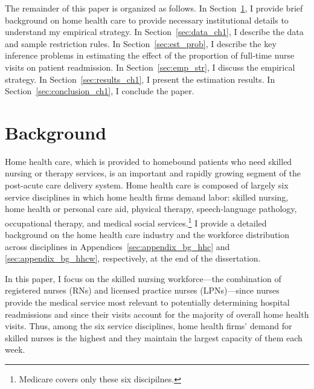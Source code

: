 \documentclass[final,12pt]{article}
\begin{document}
The remainder of this paper is organized as follows.
In Section~\ref{sec:background_ch1}, I provide brief background on home health care to provide necessary institutional details to understand my empirical strategy.  %
In Section~\ref{sec:data_ch1}, I describe the data and sample restriction rules.
In Section~\ref{sec:est_prob}, I describe the key inference problems in estimating the effect of the proportion of full-time nurse visits on patient readmission.
In Section~\ref{sec:emp_str}, I discuss the empirical strategy.
In Section~\ref{sec:results_ch1}, I present the estimation results.
In Section~\ref{sec:conclusion_ch1}, I conclude the paper.


\section{Background} \label{sec:background_ch1}


Home health care, which is provided to homebound patients who need skilled nursing or therapy services, is an important and rapidly growing segment of the post-acute care delivery system.
Home health care is composed of largely six service disciplines in which home health firms demand labor: skilled nursing, home health or personal care aid, physical therapy, speech-language pathology, occupational therapy, and medical social services.\footnote{Medicare covers only these six discipilnes.}
I provide a detailed background on the home health care industry and the workforce distribution across disciplines in Appendices~\ref{sec:appendix_bg_hhc} and \ref{sec:appendix_bg_hhcw}, respectively, at the end of the dissertation.

In this paper, I focus on the skilled nursing workforce---the combination of registered nurses (RNs) and licensed practice nurses (LPNs)---since nurses provide the medical service most relevant to potentially determining hospital readmissions and since their visits account for the majority of overall home health visits.
Thus, among the six service disciplines, home health firms' demand for skilled nurses is the highest and they maintain the largest capacity of them each week.
\end{document}
